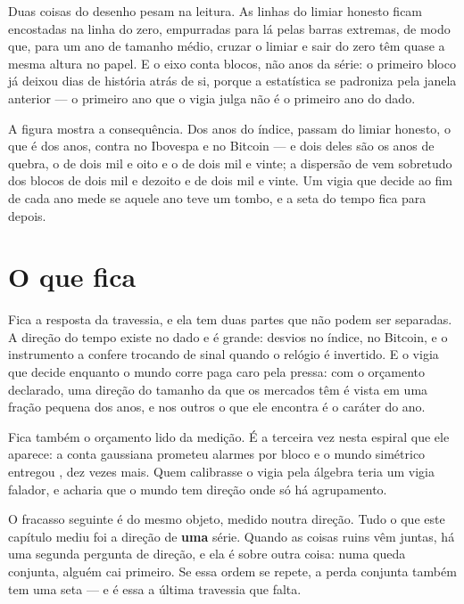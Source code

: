Duas coisas do desenho pesam na leitura. As linhas do limiar honesto ficam encostadas na linha do
zero, empurradas para lá pelas barras extremas, de modo que, para um ano de tamanho médio, cruzar o
limiar e sair do zero têm quase a mesma altura no papel. E o eixo conta blocos, não anos da série: o
primeiro bloco já deixou \numDirecaoJanela{} dias de história atrás de si, porque a estatística se
padroniza pela janela anterior --- o primeiro ano que o vigia julga não é o primeiro ano do dado.

A figura mostra a consequência. Dos \numDirecaoIndiceBlocos{} anos do índice,
\numDirecaoIndiceBlocosAcima{} passam do limiar honesto, o que é
\numDirecaoIndiceAcertoHonesto{} dos anos, contra \numDirecaoIbovespaAcertoHonesto{} no Ibovespa e
\numDirecaoBitcoinAcertoHonesto{} no Bitcoin --- e
dois deles são os anos de quebra, o de dois mil e oito e o de dois mil e vinte; a dispersão de
\numDirecaoIndiceDispersaoBlocos{} vem sobretudo dos blocos de dois mil e dezoito e de dois mil e
vinte. Um vigia que decide ao fim de cada ano mede se aquele ano teve um tombo, e a seta do tempo fica para
depois.

\section{O que fica}

Fica a resposta da travessia, e ela tem duas partes que não podem ser separadas. A direção do tempo
existe no dado e é grande: \numDirecaoIndiceRazao{} desvios no índice, \numDirecaoBitcoinRazao{} no
Bitcoin, e o instrumento a confere trocando de sinal quando o relógio é invertido. E o vigia que
decide enquanto o mundo corre paga caro pela pressa: com o orçamento declarado, uma direção do tamanho
da que os mercados têm é vista em uma fração pequena dos anos, e nos outros o que ele encontra é o
caráter do ano.

Fica também o orçamento lido da medição. É a terceira vez nesta espiral que ele aparece: a conta
gaussiana prometeu \numDirecaoContaTaxa{} alarmes por bloco e o mundo simétrico entregou
\numDirecaoNuloTaxa{}, dez vezes mais. Quem calibrasse o vigia pela álgebra teria um vigia falador, e
acharia que o mundo tem direção onde só há agrupamento.

O fracasso seguinte é do mesmo objeto, medido noutra direção. Tudo o que este capítulo mediu foi a
direção de \textbf{uma} série. Quando as coisas ruins vêm juntas, há uma segunda pergunta de direção, e ela é sobre outra
coisa: numa queda conjunta, alguém cai primeiro. Se essa ordem se
repete, a perda conjunta também tem uma seta --- e é essa a última travessia que falta.
